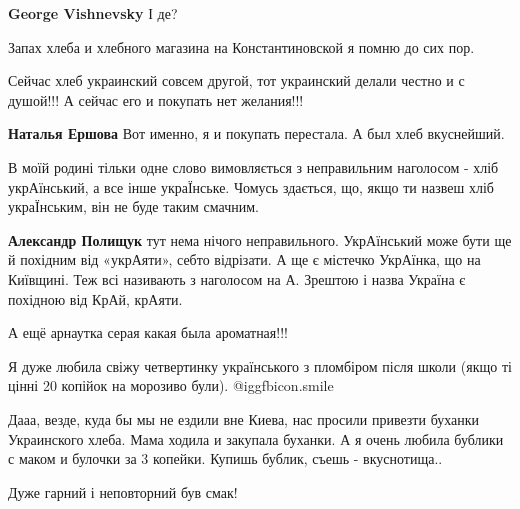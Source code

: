 \begin{itemize}
\begin{itemize}
\textbf{George Vishnevsky} І де?

\end{itemize} %

Запах хлеба и хлебного магазина на Константиновской я помню до сих пор.

Сейчас хлеб украинский совсем другой, тот украинский делали честно и с душой!!! А сейчас его и покупать нет желания!!!

\textbf{Наталья Ершова} Вот именно, я и покупать перестала. А был хлеб вкуснейший.


В моїй родині тільки одне слово вимовляється з неправильним наголосом - хліб
укрАїнський, а все інше украЇнське. Чомусь здається, що, якщо ти назвеш хліб
украЇнським, він не буде таким смачним.

\begin{itemize} %
\textbf{Александр Полищук} тут нема нічого неправильного. УкрАїнський може бути ще й похідним від «укрАяти», себто відрізати. А ще є містечко УкрАїнка, що на Київщині. Теж всі називають з наголосом на А. Зрештою і назва Україна є похідною від КрАй, крАяти.
\end{itemize} %

А ещё арнаутка серая какая была ароматная!!!

Я дуже любила свіжу четвертинку українського з пломбіром після школи (якщо ті
цінні 20 копійок на морозиво були).  @igg{fbicon.smile} 


Дааа, везде, куда бы мы не ездили вне Киева, нас просили привезти буханки
Украинского хлеба. Мама ходила и закупала буханки. А я очень любила бублики с
маком и булочки за 3 копейки. Купишь бублик, съешь - вкуснотища..

Дуже гарний і неповторний був смак!



\end{itemize} %
